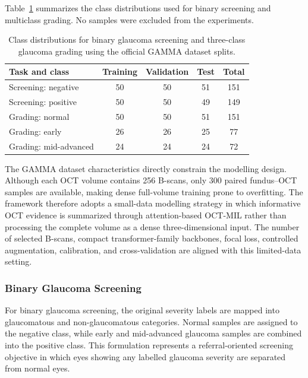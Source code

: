 \documentclass[sn-mathphys]{sn-jnl}%
\theoremstyle{thmstyleone}%
\theoremstyle{thmstyletwo}%
\theoremstyle{thmstylethree}%
\begin{document}
Table~\ref{tab:dataset_summary} summarizes the class distributions used for binary screening and multiclass grading. No samples were excluded from the experiments.

\begin{table}[!t]
    \centering
    \caption{Class distributions for binary glaucoma screening and three-class glaucoma grading using the official GAMMA dataset splits.}
    \label{tab:dataset_summary}
    \begin{tabular}{lcccc}
        \hline
        \textbf{Task and class} &
        \textbf{Training}       &
        \textbf{Validation}     &
        \textbf{Test}           &
        \textbf{Total}                               \\
        \hline
        Screening: negative     & 50 & 50 & 51 & 151 \\
        Screening: positive     & 50 & 50 & 49 & 149 \\
        \hline
        Grading: normal         & 50 & 50 & 51 & 151 \\
        Grading: early          & 26 & 26 & 25 & 77  \\
        Grading: mid-advanced   & 24 & 24 & 24 & 72  \\
        \hline
    \end{tabular}
\end{table}

The GAMMA dataset characteristics directly constrain the modelling design. Although each OCT volume contains 256 B-scans, only 300 paired fundus--OCT samples are available, making dense full-volume training prone to overfitting. The framework therefore adopts a small-data modelling strategy in which informative OCT evidence is summarized through attention-based OCT-MIL rather than processing the complete volume as a dense three-dimensional input. The number of selected B-scans, compact transformer-family backbones, focal loss, controlled augmentation, calibration, and cross-validation are aligned with this limited-data setting.

\subsubsection{Binary Glaucoma Screening}
\label{subsubsec:binary_screening}

For binary glaucoma screening, the original severity labels are mapped into glaucomatous and non-glaucomatous categories. Normal samples are assigned to the negative class, while early and mid-advanced glaucoma samples are combined into the positive class. This formulation represents a referral-oriented screening objective in which eyes showing any labelled glaucoma severity are separated from normal eyes.
\end{document}
